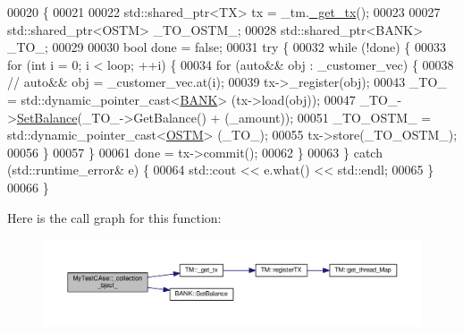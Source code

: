 \begin{DoxyCode}
00020                                                                                                            
              \{
00021     
00022      std::shared\_ptr<TX> tx = \_tm.\hyperlink{class_t_m_a41cb0226cc4080c931651b13f74a0075_a41cb0226cc4080c931651b13f74a0075}{\_get\_tx}();
00023 
00027     std::shared\_ptr<OSTM> \_TO\_OSTM\_;
00028     std::shared\_ptr<BANK>  \_TO\_;
00029 
00030     \textcolor{keywordtype}{bool} done = \textcolor{keyword}{false};
00031     \textcolor{keywordflow}{try} \{
00032         \textcolor{keywordflow}{while} (!done) \{
00033             \textcolor{keywordflow}{for} (\textcolor{keywordtype}{int} i = 0; i < loop; ++i) \{
00034                 \textcolor{keywordflow}{for} (\textcolor{keyword}{auto}&& obj : \_customer\_vec) \{
00038                     \textcolor{comment}{// auto&& obj = \_customer\_vec.at(i);}
00039                     tx->\_register(obj);
00043                     \_TO\_ = std::dynamic\_pointer\_cast<\hyperlink{class_b_a_n_k}{BANK}> (tx->load(obj));
00047                     \_TO\_->\hyperlink{class_b_a_n_k_ae3e45b407bf8ec7175662442ea24b7c0_ae3e45b407bf8ec7175662442ea24b7c0}{SetBalance}(\_TO\_->GetBalance() + (\_amount));
00051                     \_TO\_OSTM\_ = std::dynamic\_pointer\_cast<\hyperlink{class_o_s_t_m}{OSTM}> (\_TO\_);
00055                     tx->store(\_TO\_OSTM\_);
00056                 \}
00057             \}
00061             done = tx->commit();
00062         \}
00063     \} \textcolor{keywordflow}{catch} (std::runtime\_error& e) \{
00064         std::cout << e.what() << std::endl;
00065     \}
00066 \}
\end{DoxyCode}


Here is the call graph for this function\+:
\nopagebreak
\begin{figure}[H]
\begin{center}
\leavevmode
\includegraphics[width=350pt]{class_my_test_c_ase_a9ec1ddfc6e7f727446e1a8355086c2dd_a9ec1ddfc6e7f727446e1a8355086c2dd_cgraph}
\end{center}
\end{figure}


